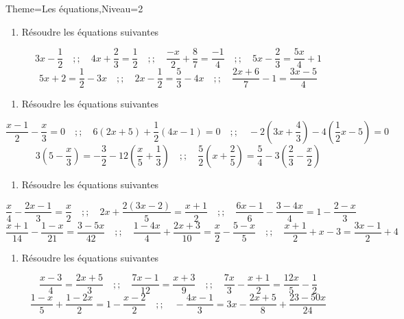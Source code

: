 \documentclass[a4paper,12pt]{article}
\begin{document}
\begin{Maquette}[Fiche]{Theme=Les équations,Niveau=2}


\begin{exercice}
\begin{enumerate}
\item Résoudre les équations suivantes 
\end{enumerate}
\[
3x-\dfrac{1}{2}\quad ;; \quad
4x+\dfrac{2}{3}=\dfrac{1}{2}\quad ;; \quad
\dfrac{-x}{2}+\dfrac{8}{7}=\dfrac{-1}{4}\quad ;; \quad
5x-\dfrac{2}{3}=\dfrac{5x}{4}+1
\]
\[
5x+2=\dfrac{1}{2}-3x\quad ;; \quad
2x-\dfrac{1}{2}=\dfrac{5}{3}-4x\quad ;; \quad
\dfrac{2x+6}{7}-1=\dfrac{3x-5}{4}
\]
\end{exercice}

\begin{exercice}
\begin{enumerate}
\item Résoudre les équations suivantes 
\end{enumerate}
\[
\dfrac{x-1}{2}-\dfrac{x}{3}=0\quad ;; \quad
6\left(2x+5\right)+\dfrac{1}{2}\left(4x-1\right)=0\quad ;; \quad
-2\left(3x+\dfrac{4}{3}\right)-4\left(\dfrac{1}{2}x-5\right)=0
\]
\[
3\left(5-\dfrac{x}{3}\right)=-\dfrac{3}{2}-12\left(\dfrac{x}{5}+\dfrac{1}{3}\right)\quad ;; \quad
\dfrac{5}{2}\left(x+\dfrac{2}{5}\right)=\dfrac{5}{4}-3\left(\dfrac{2}{3}-\dfrac{x}{2}\right)
\]
\end{exercice}
\begin{exercice}
\begin{enumerate}
\item Résoudre les équations suivantes 
\end{enumerate}
\[
\dfrac{x}{4}-\dfrac{2x-1}{3}=\dfrac{x}{2}\quad ;; \quad
2x+\dfrac{2\left(3x-2\right)}{5}=\dfrac{x+1}{2}\quad ;; \quad
\dfrac{6x-1}{6}-\dfrac{3-4x}{4}=1-\dfrac{2-x}{3}
\]
\[
\dfrac{x+1}{14}-\dfrac{1-x}{21}=\dfrac{3-5x}{42}\quad ;; \quad
\dfrac{1-4x}{4}+\dfrac{2x+3}{10}=\dfrac{x}{2}-\dfrac{5-x}{5}\quad ;; \quad
\dfrac{x+1}{2}+x-3=\dfrac{3x-1}{2}+4
\]
\end{exercice}

\begin{exercice}
\begin{enumerate}
\item Résoudre les équations suivantes 
\end{enumerate}
\[
\dfrac{x-3}{4}=\dfrac{2x+5}{3}\quad ;; \quad
\dfrac{7x-1}{12}=\dfrac{x+3}{9}\quad ;; \quad
\dfrac{7x}{3}-\dfrac{x+1}{2}=\dfrac{12x}{5}-\dfrac{1}{2}
\]
\[
\dfrac{1-x}{5}+\dfrac{1-2x}{2}=1-\dfrac{x-2}{2}\quad ;; \quad
-\dfrac{4x-1}{3}=3x-\dfrac{2x+5}{8}+\dfrac{23-50x}{24}
\]
\end{exercice}


\end{Maquette}
\end{document}
